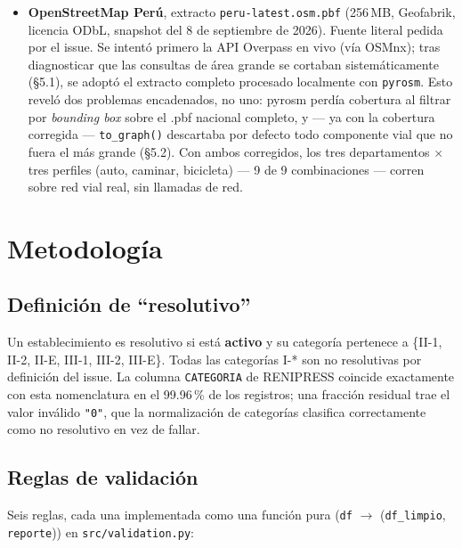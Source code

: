 \documentclass[11pt]{article}
\begin{document}
\begin{itemize}
\item \textbf{OpenStreetMap Perú}, extracto \texttt{peru-latest.osm.pbf}
  (256\,MB, Geofabrik, licencia ODbL, snapshot del 8 de septiembre de 2026).
  Fuente literal pedida por el issue. Se intentó primero la API Overpass en
  vivo (vía OSMnx); tras diagnosticar que las consultas de área grande se
  cortaban sistemáticamente (\S5.1), se adoptó el extracto completo
  procesado localmente con \texttt{pyrosm}. Esto reveló dos problemas
  encadenados, no uno: pyrosm perdía cobertura al filtrar por
  \emph{bounding box} sobre el .pbf nacional completo, y --- ya con la
  cobertura corregida --- \texttt{to\_graph()} descartaba por defecto todo
  componente vial que no fuera el más grande (\S5.2). Con ambos corregidos,
  los tres departamentos $\times$ tres perfiles (auto, caminar, bicicleta)
  --- 9 de 9 combinaciones --- corren sobre red vial real, sin llamadas de
  red.
\end{itemize}

\section{Metodología}

\subsection{Definición de ``resolutivo''}

Un establecimiento es resolutivo si está \textbf{activo} y su categoría
pertenece a \{II-1, II-2, II-E, III-1, III-2, III-E\}. Todas las categorías
I-* son no resolutivas por definición del issue. La columna
\texttt{CATEGORIA} de RENIPRESS coincide exactamente con esta nomenclatura
en el 99.96\,\% de los registros; una fracción residual trae el valor
inválido \texttt{"0"}, que la normalización de categorías clasifica
correctamente como no resolutivo en vez de fallar.

\subsection{Reglas de validación}

Seis reglas, cada una implementada como una función pura
(\texttt{df} $\to$ (\texttt{df\_limpio}, \texttt{reporte})) en
\texttt{src/validation.py}:
\end{document}
